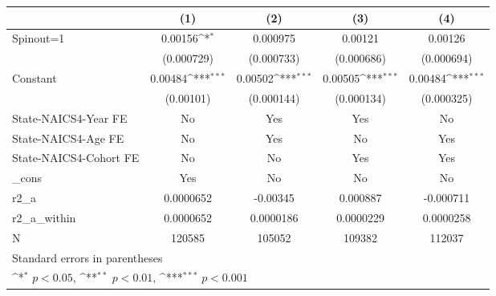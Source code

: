{
\def\sym#1{\ifmmode^{#1}\else\(^{#1}\)\fi}
\begin{tabular}{l*{4}{c}}
\hline\hline
                    &\multicolumn{1}{c}{(1)}         &\multicolumn{1}{c}{(2)}         &\multicolumn{1}{c}{(3)}         &\multicolumn{1}{c}{(4)}         \\
\hline
Spinout=1           &     0.00156\sym{*}  &    0.000975         &     0.00121         &     0.00126         \\
                    &  (0.000729)         &  (0.000733)         &  (0.000686)         &  (0.000694)         \\
[1em]
Constant            &     0.00484\sym{***}&     0.00502\sym{***}&     0.00505\sym{***}&     0.00484\sym{***}\\
                    &   (0.00101)         &  (0.000144)         &  (0.000134)         &  (0.000325)         \\
[1em]
State-NAICS4-Year FE&          No         &         Yes         &         Yes         &          No         \\
[1em]
State-NAICS4-Age FE &          No         &         Yes         &          No         &         Yes         \\
[1em]
State-NAICS4-Cohort FE&          No         &          No         &         Yes         &         Yes         \\
[1em]
\_cons              &         Yes         &          No         &          No         &          No         \\
\hline
r2\_a                &   0.0000652         &    -0.00345         &    0.000887         &   -0.000711         \\
r2\_a\_within         &   0.0000652         &   0.0000186         &   0.0000229         &   0.0000258         \\
N                   &      120585         &      105052         &      109382         &      112037         \\
\hline\hline
\multicolumn{5}{l}{\footnotesize Standard errors in parentheses}\\
\multicolumn{5}{l}{\footnotesize \sym{*} \(p<0.05\), \sym{**} \(p<0.01\), \sym{***} \(p<0.001\)}\\
\end{tabular}
}
